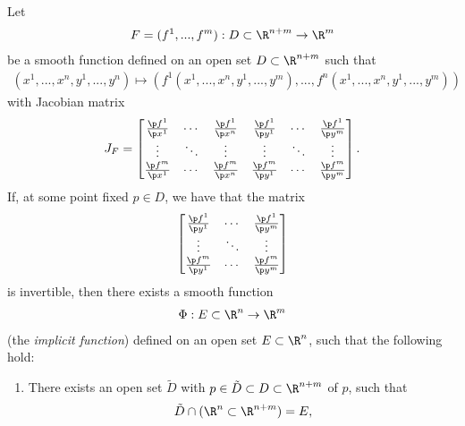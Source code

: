 \documentclass{article}
\begin{document}
\begin{theorem}
    Let
    \begin{align*}
        F = (f^1,...,f^m):D\subset \R^{n+m}\to\R^m \\
    \end{align*}
    be a smooth function defined on an open set $D\subset\R^{n+m}$ such that
    \begin{align*}
        (x^1,...,x^n,y^1,...,y^n)\mapsto (f^1(x^1,...,x^n,y^1,...,y^m), ..., f^n(x^1,...,x^n,y^1,...,y^m))
    \end{align*}
    with Jacobian matrix
    \begin{align*}
        J_F = \begin{bmatrix}
            \frac{\p f^1}{\p x^1} & \cdots & \frac{\p f^1}{\p x^n} & \frac{\p f^1}{\p y^1} & \cdots & \frac{\p f^1}{\p y^m} \\
            \vdots                & \ddots & \vdots                & \vdots                & \ddots & \vdots                \\
            \frac{\p f^m}{\p x^1} & \cdots & \frac{\p f^m}{\p x^n} & \frac{\p f^m}{\p y^1} & \cdots & \frac{\p f^m}{\p y^m}
        \end{bmatrix}.
    \end{align*}
    If, at some point fixed $p\in D$, we have that the matrix
    \begin{align*}
        \begin{bmatrix}
            \frac{\p f^1}{\p y^1} & \cdots & \frac{\p f^1}{\p y^m} \\
            \vdots                & \ddots & \vdots                \\
            \frac{\p f^m}{\p y^1} & \cdots & \frac{\p f^m}{\p y^m}
        \end{bmatrix}
    \end{align*}
    is invertible,
    then there exists a smooth function
    \begin{align*}
        \Phi : E \subset \R^n \to \R^m
    \end{align*}
    (the \emph{implicit function}) defined on an open set $E\subset \R^n$, such that
    the following hold:
    \begin{enumerate}
        \item There exists an open set $\tilde D$ with $p\in \tilde D\subset D\subset\R^{n+m}$ of $p$, such that  \begin{align*}
                  \tilde D \cap (\R^n\subset\R^{n+m})=E,
              \end{align*}

\end{enumerate}
\end{theorem}
\end{document}
